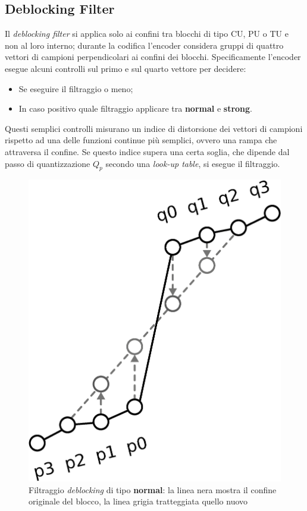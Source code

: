 \subsection{Deblocking Filter}
Il \emph{deblocking filter} si applica solo ai confini tra blocchi di tipo CU, 
PU o TU e non al loro interno; durante la codifica  l'encoder considera gruppi 
di quattro vettori di campioni perpendicolari ai confini dei blocchi. 
Specificamente l'encoder esegue alcuni controlli sul primo e sul quarto vettore 
per decidere:
\begin{itemize}
\item Se eseguire il filtraggio o meno;
\item In caso positivo quale filtraggio applicare tra \textbf{normal} e 
\textbf{strong}.
\end{itemize}
Questi semplici controlli misurano un indice di distorsione dei vettori di 
campioni rispetto ad una delle funzioni continue più semplici, ovvero una rampa 
che attraversa il confine. Se questo indice supera 
una certa soglia, che dipende dal passo di quantizzazione $Q_p$ secondo una 
\emph{look-up table}, si esegue il filtraggio.

\begin{figure}[H]
  \captionsetup{justification=raggedright}
  \centering
  \includegraphics[scale=0.3]{Figures/Deblocking_filter}
    \caption[Filtraggio \emph{deblocking} di tipo \textbf{normal}]
    {Filtraggio \emph{deblocking} di tipo \textbf{normal}: la linea nera mostra
      il confine originale del blocco, la linea grigia tratteggiata quello 
      nuovo}
\end{figure}

